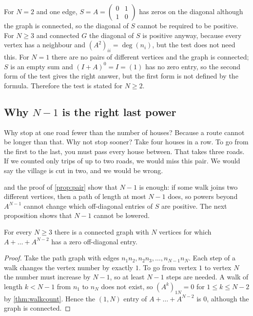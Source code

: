 \begin{remark}[why the diagonal is skipped, and the cases $N=1$ and $N=2$]\label{rem:diagonal}
For $N=2$ and one edge, $S=A=\begin{pmatrix}0&1\\1&0\end{pmatrix}$ has zeros on the diagonal although the graph is connected, so the diagonal of $S$ cannot be required to be positive.
For $N\ge 3$ and connected $G$ the diagonal of $S$ is positive anyway, because every vertex has a neighbour and $(A^2)_{ii}=\deg(n_i)$, but the test does not need this.
For $N=1$ there are no pairs of different vertices and the graph is connected; $S$ is an empty sum and $(I+A)^0=I=(1)$ has no zero entry, so the second form of the test gives the right answer, but the first form is not defined by the formula.
Therefore the test is stated for $N\ge 2$.
\end{remark}

\subsection{Why $N-1$ is the right last power}\label{sec:sharp}

\plainwords Why stop at one road fewer than the number of houses?
Because a route cannot be longer than that.
Why not stop sooner?
Take four houses in a row.
To go from the first to the last, you must pass every house between.
That takes three roads.
If we counted only trips of up to two roads, we would miss this pair.
We would say the village is cut in two, and we would be wrong.

 and the proof of \cref{prop:pair} show that $N-1$ is enough: if some walk joins two different vertices, then a path of length at most $N-1$ does, so powers beyond $A^{N-1}$ cannot change which off-diagonal entries of $S$ are positive.
The next proposition shows that $N-1$ cannot be lowered.

\begin{proposition}\label{prop:sharp}
For every $N\ge 3$ there is a connected graph with $N$ vertices for which $A+\dots+A^{N-2}$ has a zero off-diagonal entry.
\end{proposition}

\begin{proof}
Take the path graph with edges $n_1n_2,n_2n_3,\dots,n_{N-1}n_N$.
Each step of a walk changes the vertex number by exactly $1$.
To go from vertex $1$ to vertex $N$ the number must increase by $N-1$, so at least $N-1$ steps are needed.
A walk of length $k<N-1$ from $n_1$ to $n_N$ does not exist, so $(A^k)_{1N}=0$ for $1\le k\le N-2$ by \cref{thm:walkcount}.
Hence the $(1,N)$ entry of $A+\dots+A^{N-2}$ is $0$, although the graph is connected.
\end{proof}

